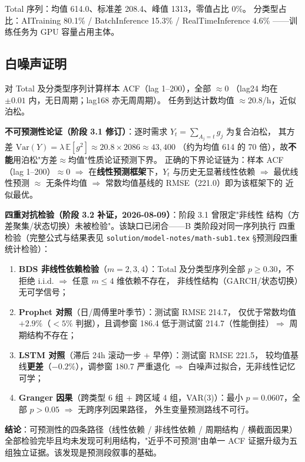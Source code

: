 \documentclass{internal-report}
\begin{document}
Total 序列：均值 614.0、标准差 208.4、峰值 1313，零值占比 0\%。
分类型占比：AITraining 80.1\% / BatchInference 15.3\% / RealTimeInference 4.6\%
——训练任务为 GPU 容量占用主体。

\subsection{白噪声证明}

对 Total 及分类型序列计算样本 ACF（lag 1--200），全部 $\approx 0$
（lag24 均在 $\pm 0.01$ 内，无日周期；lag168 亦无周周期）。
任务到达计数均值 $\approx 20.8$/h，近似泊松。

\textbf{不可预测性论证（阶段 3.1 修订）}：逐时需求 $Y_t=\sum_{A_j=t} g_j$ 为复合泊松，
其方差 $\mathrm{Var}(Y)=\lambda\,\mathbb{E}[g^2]\approx 20.8\times 2086\approx 43{,}400$
（约为均值 614 的 70 倍），故\textbf{不能}用泊松"方差$\approx$均值"性质论证预测下界。
正确的下界论证链为：样本 ACF（lag 1--200）$\approx 0$ $\Rightarrow$
在\textbf{线性预测框架}下，$Y_t$ 与历史无显著线性依赖 $\Rightarrow$ 最优线性预测
$\approx$ 无条件均值 $\Rightarrow$ 常数均值基线的 RMSE（221.0）即为该框架下的
近似最优。

\textbf{四重对抗检验（阶段 3.2 补证，2026-08-09）}：阶段 3.1 曾限定"非线性
结构（方差聚集/状态切换）未被检验"。该缺口已闭合——B 类阶段对同一序列执行
四重检验（完整公式与结果表见
\texttt{solution/model-notes/math-sub1.tex} \S 预测段四重统计检验）：
\begin{enumerate}
  \item \textbf{BDS 非线性依赖检验}（$m=2,3,4$）：Total 及分类型序列全部
        $p\ge0.30$，不拒绝 i.i.d. $\Rightarrow$ 任意 $m\le4$ 维依赖不存在，
        非线性结构（GARCH/状态切换）无可学信号；
  \item \textbf{Prophet 对照}（日/周傅里叶季节）：测试窗 RMSE 214.7，
        仅优于常数均值 $+2.9\%$（$<5\%$ 判据），且调参窗 186.4 低于测试窗
        214.7（性能倒挂）$\Rightarrow$ 周期结构不存在；
  \item \textbf{LSTM 对照}（滞后 24h 滚动一步 + 早停）：测试窗 RMSE 221.5，
        较均值基线\textbf{更差}（$-0.2\%$），调参窗 180.7 严重退化
        $\Rightarrow$ 白噪声过拟合，无非线性记忆可学；
  \item \textbf{Granger 因果}（跨类型 6 组 + 跨区域 4 组，VAR(3)）：最小
        $p=0.0607$，全部 $p>0.05$ $\Rightarrow$ 无跨序列因果路径，
        外生变量预测路线不可行。
\end{enumerate}
\textbf{结论}：可预测性的四条路径（线性依赖 / 非线性依赖 / 周期结构 /
横截面因果）全部检验完毕且均未发现可利用结构，"近乎不可预测"由单一 ACF
证据升级为五组独立证据。该发现是预测段叙事的基础。
\end{document}
